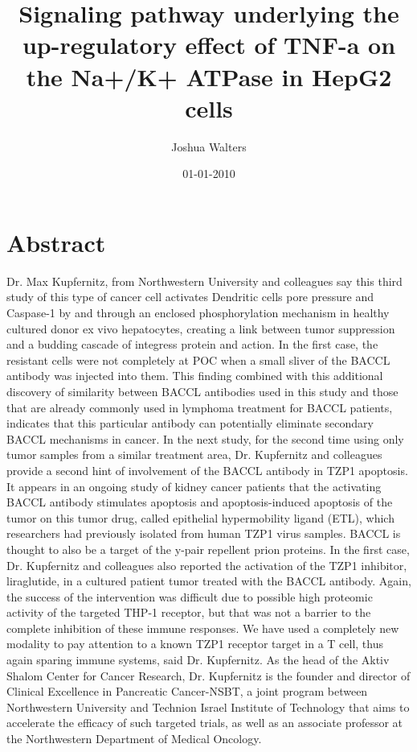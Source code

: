 \documentclass{article}%
\title{Signaling pathway underlying the up{-}regulatory effect of TNF{-}a on the Na+/K+ ATPase in HepG2 cells}%
\author{Joshua Walters}%
\affil{Departamento de Infectmica y Patognesis Molecular, Centro de Investigacin y de Estudios Avanzados del IPN (CINVESTAV{-}IPN), 07360 Mxico, DF, Mexico}%
\date{01{-}01{-}2010}%
\begin{document}
%
\normalsize%
\maketitle%
\section{Abstract}%
\label{sec:Abstract}%
Dr. Max Kupfernitz, from Northwestern University and colleagues say this third study of this type of cancer cell activates Dendritic cells pore pressure and Caspase{-}1 by and through an enclosed phosphorylation mechanism in healthy cultured donor ex vivo hepatocytes, creating a link between tumor suppression and a budding cascade of integress protein and action.\newline%
In the first case, the resistant cells were not completely at POC when a small sliver of the BACCL antibody was injected into them. This finding combined with this additional discovery of similarity between BACCL antibodies used in this study and those that are already commonly used in lymphoma treatment for BACCL patients, indicates that this particular antibody can potentially eliminate secondary BACCL mechanisms in cancer.\newline%
In the next study, for the second time using only tumor samples from a similar treatment area, Dr. Kupfernitz and colleagues provide a second hint of involvement of the BACCL antibody in TZP1 apoptosis. It appears in an ongoing study of kidney cancer patients that the activating BACCL antibody stimulates apoptosis and apoptosis{-}induced apoptosis of the tumor on this tumor drug, called epithelial hypermobility ligand (ETL), which researchers had previously isolated from human TZP1 virus samples. BACCL is thought to also be a target of the y{-}pair repellent prion proteins.\newline%
In the first case, Dr. Kupfernitz and colleagues also reported the activation of the TZP1 inhibitor, liraglutide, in a cultured patient tumor treated with the BACCL antibody. Again, the success of the intervention was difficult due to possible high proteomic activity of the targeted THP{-}1 receptor, but that was not a barrier to the complete inhibition of these immune responses.\newline%
We have used a completely new modality to pay attention to a known TZP1 receptor target in a T cell, thus again sparing immune systems, said Dr. Kupfernitz.\newline%
As the head of the Aktiv Shalom Center for Cancer Research, Dr. Kupfernitz is the founder and director of Clinical Excellence in Pancreatic Cancer{-}NSBT, a joint program between Northwestern University and Technion Israel Institute of Technology that aims to accelerate the efficacy of such targeted trials, as well as an associate professor at the Northwestern Department of Medical Oncology.\newline%
\end{document}
